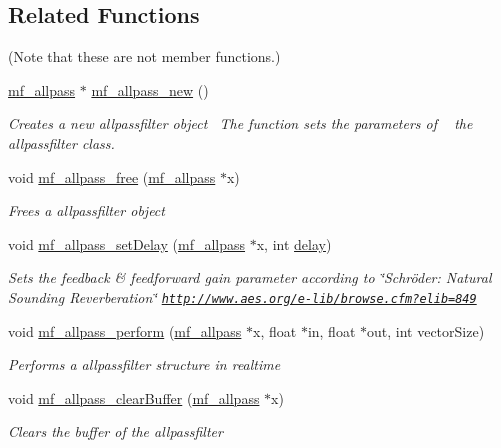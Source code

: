\subsection*{Related Functions}
(Note that these are not member functions.) \begin{DoxyCompactItemize}
\item 
\mbox{\hyperlink{structmf__allpass}{mf\+\_\+allpass}} $\ast$ \mbox{\hyperlink{structmf__allpass_a743b02b600467e4fff788842b303a432}{mf\+\_\+allpass\+\_\+new}} ()
\begin{DoxyCompactList}\small\item\em Creates a new allpassfilter object~\newline
 The function sets the parameters of ~\newline
 the allpassfilter class. \end{DoxyCompactList}\item 
void \mbox{\hyperlink{structmf__allpass_a36b0067cba49f41dccbff7c2ecc155f1}{mf\+\_\+allpass\+\_\+free}} (\mbox{\hyperlink{structmf__allpass}{mf\+\_\+allpass}} $\ast$x)
\begin{DoxyCompactList}\small\item\em Frees a allpassfilter object~\newline
 \end{DoxyCompactList}\item 
void \mbox{\hyperlink{structmf__allpass_a049acefc61228da407759fcdb5088c70}{mf\+\_\+allpass\+\_\+set\+Delay}} (\mbox{\hyperlink{structmf__allpass}{mf\+\_\+allpass}} $\ast$x, int \mbox{\hyperlink{structmf__allpass_a016ac476fe7e954a488af64836957787}{delay}})
\begin{DoxyCompactList}\small\item\em Sets the feedback \& feedforward gain parameter according to \char`\"{}\+Schröder\+: Natural Sounding Reverberation\char`\"{} \href{http://www.aes.org/e-lib/browse.cfm?elib=849}{\tt http\+://www.\+aes.\+org/e-\/lib/browse.\+cfm?elib=849} ~\newline
 \end{DoxyCompactList}\item 
void \mbox{\hyperlink{structmf__allpass_a38ca5027a80c82fd242d7f40e02cd960}{mf\+\_\+allpass\+\_\+perform}} (\mbox{\hyperlink{structmf__allpass}{mf\+\_\+allpass}} $\ast$x, float $\ast$in, float $\ast$out, int vector\+Size)
\begin{DoxyCompactList}\small\item\em Performs a allpassfilter structure in realtime ~\newline
 \end{DoxyCompactList}\item 
void \mbox{\hyperlink{structmf__allpass_a38aaea521b618aabcfdbe4b27f7da14b}{mf\+\_\+allpass\+\_\+clear\+Buffer}} (\mbox{\hyperlink{structmf__allpass}{mf\+\_\+allpass}} $\ast$x)
\begin{DoxyCompactList}\small\item\em Clears the buffer of the allpassfilter~\newline
 \end{DoxyCompactList}\end{DoxyCompactItemize}


